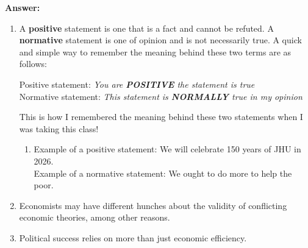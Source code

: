 \documentclass[12pt]{article}
\begin{document}
\medskip

\textbf{Answer:}

\begin{enumerate}
    \item A \textbf{positive} statement is one that is a fact and cannot be refuted. A \textbf{normative} statement is one of opinion and is not necessarily true.
\medskip
A quick and simple way to remember the meaning behind these two terms are as follows:
\begin{center}
    Positive statement:  \textit{You are \textbf{POSITIVE} the statement is true} \\
    Normative statement: \textit{This statement is \textbf{NORMALLY} true in my opinion}
\end{center}
This is how I remembered the meaning behind these two statements when I was taking this class! 
    \begin{enumerate}
        \item Example of a positive statement: We will celebrate 150 years of JHU in 2026. \\
        Example of a normative statement: We ought to do more to help the poor.
    \end{enumerate}
    \item Economists may have different hunches about the validity of conflicting economic theories, among other reasons.
    \item Political success relies on more than just economic efficiency.
\end{enumerate}
\end{document}
